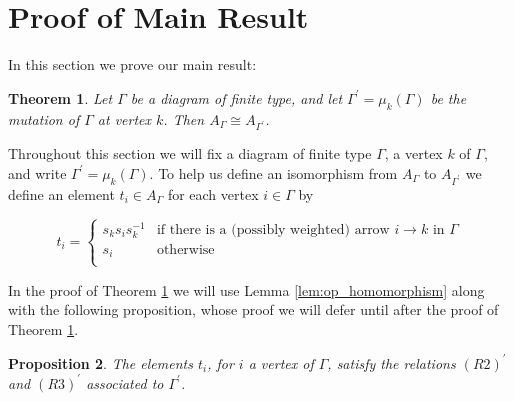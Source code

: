 \documentclass[11pt]{amsart}
\newtheorem{thm}{Theorem}[section]
\newtheorem{prop}[thm]{Proposition}
\theoremstyle{definition}
\begin{document}
\section{Proof of Main Result}\label{sec:proof_of_main}


In this section we prove our main result:


\begin{thm}\label{thm:main}
Let $\Gamma$ be a diagram of finite type, and let $\Gamma^{\prime} = \mu_k(\Gamma)$ be the mutation of $\Gamma$ at vertex $k$.  Then $A_{\Gamma} \cong A_{\Gamma^{\prime}}$.
\end{thm}

Throughout this section we will fix a diagram of finite type $\Gamma$, a vertex $k$ of $\Gamma$, and write $\Gamma^{\prime} = \mu_k(\Gamma)$.  To help us define an isomorphism from $A_{\Gamma}$ to $A_{\Gamma^{\prime}}$ we define an element $t_i\in A_{\Gamma}$ for each vertex $i\in \Gamma$ by

\begin{displaymath}
t_i = \begin{cases}    s_ks_is_k^{-1} & \mbox{if there is a (possibly weighted) arrow } i \rightarrow k \mbox{ in } \Gamma\\
				s_i & \mbox{otherwise}\\
	\end{cases}
\end{displaymath}

In the proof of Theorem \ref{thm:main} we will use Lemma \ref{lem:op_homomorphism} along with the following proposition, whose proof we will defer until after the proof of Theorem \ref{thm:main}.

\begin{prop}\label{prop:ti_relations}
The elements $t_i$, for $i$ a vertex of $\Gamma$, satisfy the relations $(R2)^{\prime}$ and $(R3)^{\prime}$ associated to $\Gamma^{\prime}$.
\end{prop}
\end{document}
